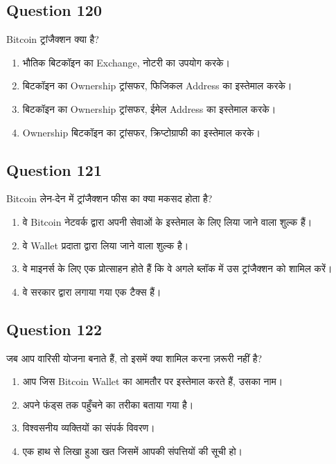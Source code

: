 \documentclass[12pt,a4paper]{article}
\begin{document}
\bigskip


\subsection*{Question 120}
Bitcoin ट्रांजैक्शन क्या है?

\begin{enumerate}[label=\Alph*., leftmargin=*]
\item भौतिक बिटकॉइन का Exchange, नोटरी का उपयोग करके।
\item बिटकॉइन का Ownership ट्रांसफर, फिजिकल Address का इस्तेमाल करके।
\item बिटकॉइन का Ownership ट्रांसफर, ईमेल Address का इस्तेमाल करके।
\item Ownership बिटकॉइन का ट्रांसफर, क्रिप्टोग्राफी का इस्तेमाल करके।
\end{enumerate}

\bigskip


\subsection*{Question 121}
Bitcoin लेन-देन में ट्रांजैक्शन फीस का क्या मकसद होता है?

\begin{enumerate}[label=\Alph*., leftmargin=*]
\item वे Bitcoin नेटवर्क द्वारा अपनी सेवाओं के इस्तेमाल के लिए लिया जाने वाला शुल्क हैं।
\item वे Wallet प्रदाता द्वारा लिया जाने वाला शुल्क है।
\item वे माइनर्स के लिए एक प्रोत्साहन होते हैं कि वे अगले ब्लॉक में उस ट्रांजैक्शन को शामिल करें।
\item वे सरकार द्वारा लगाया गया एक टैक्स हैं।
\end{enumerate}

\bigskip


\subsection*{Question 122}
जब आप वारिसी योजना बनाते हैं, तो इसमें क्या शामिल करना ज़रूरी नहीं है?

\begin{enumerate}[label=\Alph*., leftmargin=*]
\item आप जिस Bitcoin Wallet का आमतौर पर इस्तेमाल करते हैं, उसका नाम।
\item अपने फंड्स तक पहुँचने का तरीका बताया गया है।
\item विश्वसनीय व्यक्तियों का संपर्क विवरण।
\item एक हाथ से लिखा हुआ खत जिसमें आपकी संपत्तियों की सूची हो।
\end{enumerate}
\end{document}
